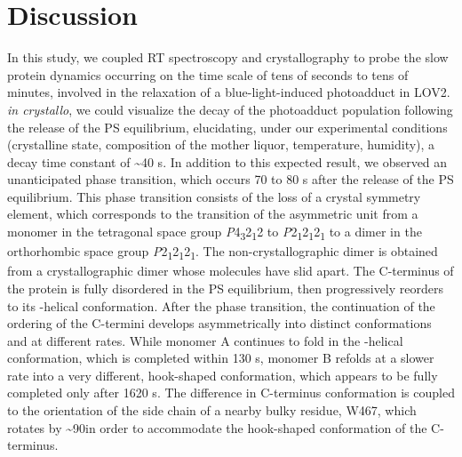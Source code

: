 \section{Discussion}\label{sec:slowprot_discussion}
In this study, we coupled RT spectroscopy and crystallography to probe the slow protein dynamics occurring on the time scale of tens of seconds to tens of minutes, involved in the relaxation of a blue-light-induced photoadduct in LOV2. \textit{in crystallo}, we could visualize the decay of the photoadduct population following the release of the PS equilibrium, elucidating, under our experimental conditions (crystalline state, composition of the mother liquor, temperature, humidity), a decay time constant of \textasciitilde40 s. In addition to this expected result, we observed an unanticipated phase transition, which occurs 70 to 80 s after the release of the PS equilibrium. This phase transition consists of the loss of a crystal symmetry element, which corresponds to the transition of the asymmetric unit from a monomer in the tetragonal space group \textit{P}4\textsubscript{3}2\textsubscript{1}2 to \textit{P}2\textsubscript{1}2\textsubscript{1}2\textsubscript{1} to a dimer in the orthorhombic space group \textit{P}2\textsubscript{1}2\textsubscript{1}2\textsubscript{1}. The non-crystallographic dimer is obtained from a crystallographic dimer whose molecules have slid apart. The C-terminus of the protein is fully disordered in the PS equilibrium, then progressively reorders to its \textalpha-helical conformation. After the phase transition, the continuation of the ordering of the C-termini develops asymmetrically into distinct conformations and at different rates. While monomer A continues to fold in the \textalpha-helical conformation, which is completed within 130 s, monomer B refolds at a slower rate into a very different, hook-shaped conformation, which appears to be fully completed only after 1620 s. The difference in C-terminus conformation is coupled to the orientation of the side chain of a nearby bulky residue, W467, which rotates by \textasciitilde90\degree in order to accommodate the hook-shaped conformation of the C-terminus.
\newline
